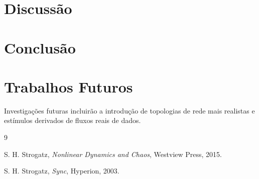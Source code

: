 \documentclass[12pt,a4paper]{article}
\begin{document}
\section{Discussão}


\section{Conclusão}


\section*{Trabalhos Futuros}

Investigações futuras incluirão a introdução de topologias de rede mais realistas e estímulos derivados de fluxos reais de dados.

\begin{thebibliography}{9}

S. H. Strogatz,
\textit{Nonlinear Dynamics and Chaos},
Westview Press, 2015.

S. H. Strogatz,
\textit{Sync},
Hyperion, 2003.

\end{thebibliography}
\end{document}
